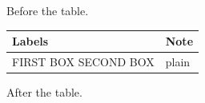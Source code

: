 \documentclass[11pt,a4paper]{article}
\begin{document}
Before the table.

\begin{table}[h]
\begin{tabular}{|l|l|}
\hline
Labels & Note \\ \hline
FIRST BOX  SECOND BOX  %
 & plain \\ \hline
\end{tabular}
\end{table}

After the table.
\end{document}
